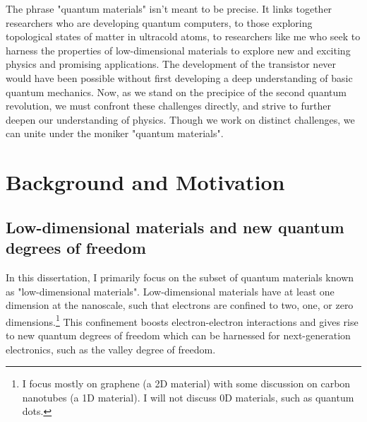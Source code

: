 \documentclass[double,12pt,1in,seploa]{beavtex}
\let\Oldsection\section
\renewcommand{\section}{\FloatBarrier\Oldsection}
\let\Oldsubsection\subsection
\renewcommand{\subsection}{\FloatBarrier\Oldsubsection}
\begin{document}
The phrase "quantum materials" isn't meant to be precise. It links together researchers who are developing quantum computers, to those exploring topological states of matter in ultracold atoms, to researchers like me who seek to harness the properties of low-dimensional materials to explore new and exciting physics and promising applications. The development of the transistor never would have been possible without first developing a deep understanding of basic quantum mechanics. Now, as we stand on the precipice of the second quantum revolution, we must confront these challenges directly, and strive to further deepen our understanding of physics. Though we work on distinct challenges, we can unite under the moniker "quantum materials". 

\section{Background and Motivation}

\subsection{Low-dimensional materials and new quantum degrees of freedom}

In this dissertation, I primarily focus on the subset of quantum materials known as "low-dimensional materials". Low-dimensional materials have at least one dimension at the nanoscale, such that electrons are confined to two, one, or zero dimensions.\footnote{I focus mostly on graphene (a 2D material) with some discussion on carbon nanotubes (a 1D material). I will not discuss 0D materials, such as quantum dots.} This confinement boosts electron-electron interactions and gives rise to new quantum degrees of freedom which can be harnessed for next-generation electronics, such as the valley degree of freedom.
\end{document}
